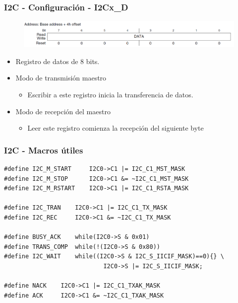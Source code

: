 \documentclass[10.5pt,scale=1.0,t,aspectratio=169,hyperref={pdfpagelabels=false}]{beamer}
\begin{document}
\begin{frame} 
	\frametitle{I2C - Configuración -  I2Cx\_D}
	{\small
		\begin{figure}
			\centering
			\includegraphics[scale=0.5]{30_I2CD}
		\end{figure}
		

			\begin{itemize}
				\item Registro de datos de 8 bits.
				\item Modo de transmisión maestro
				\begin{itemize}
					\item Escribir a este registro inicia la transferencia de datos.
				\end{itemize}
				\item Modo de recepción del maestro
				\begin{itemize}
					\item Leer este registro comienza la recepción del siguiente byte
				\end{itemize}
			\end{itemize}

		
	}
\end{frame}

\begin{frame}[fragile]
	\frametitle{I2C - Macros útiles}
	\begin{lstlisting}[style=CStyle]
#define I2C_M_START 	I2C0->C1 |= I2C_C1_MST_MASK
#define I2C_M_STOP  	I2C0->C1 &= ~I2C_C1_MST_MASK
#define I2C_M_RSTART	I2C0->C1 |= I2C_C1_RSTA_MASK

#define I2C_TRAN	I2C0->C1 |= I2C_C1_TX_MASK
#define I2C_REC		I2C0->C1 &= ~I2C_C1_TX_MASK

#define BUSY_ACK 	while(I2C0->S & 0x01)
#define TRANS_COMP	while(!(I2C0->S & 0x80))
#define I2C_WAIT	while((I2C0->S & I2C_S_IICIF_MASK)==0){} \                                 
							I2C0->S |= I2C_S_IICIF_MASK;

#define NACK	I2C0->C1 |= I2C_C1_TXAK_MASK
#define ACK    	I2C0->C1 &= ~I2C_C1_TXAK_MASK
		
	\end{lstlisting}
\end{frame}
\end{document}
